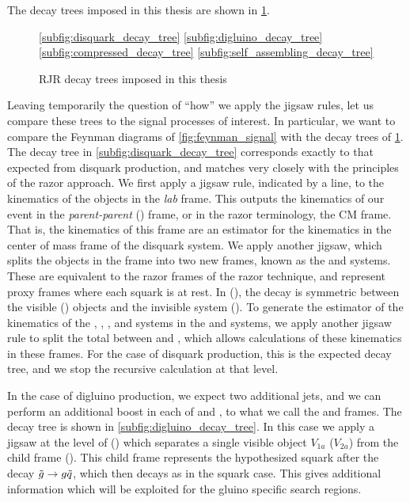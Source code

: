 The decay trees imposed in this thesis are shown in \ref{fig:decay_trees}.
\begin{figure}
\caption{RJR decay trees imposed in this thesis} \label{fig:decay_trees}
\ref{subfig:disquark_decay_tree}
\ref{subfig:digluino_decay_tree} \\
\ref{subfig:compressed_decay_tree}
\ref{subfig:self_assembling_decay_tree}
\end{figure}
Leaving temporarily the question of ``how'' we apply the jigsaw rules, let us compare these trees to the signal processes of interest.
In particular, we want to compare the Feynman diagrams of \ref{fig:feynman_signal} with the decay trees of \ref{fig:decay_trees}.
The decay tree in \ref{subfig:disquark_decay_tree} corresponds exactly to that expected from disquark production, and matches very closely with the principles of the razor approach.
We first apply a jigsaw rule, indicated by a line, to the kinematics of the objects in the \textit{lab} frame.
This outputs the kinematics of our event in the \textit{parent-parent} (\PP) frame, or in the razor terminology, the CM frame.
That is, the kinematics of this frame are an estimator for the kinematics in the center of mass frame of the disquark system.
We apply another jigsaw, which splits the objects in the \PP frame into two new frames, known as the \Pa and \Pb systems.
These are equivalent to the razor frames of the razor technique, and represent proxy frames where each squark is at rest.
In \Pa (\Pb), the decay is symmetric between the visible \Va (\Vb) objects and the invisible system \Ia (\Ib).
To generate the estimator of the kinematics of the \Va, \Vb, \Ia, and \Ib systems in the \Pa and \Pb systems, we apply another jigsaw rule to split the total \met between \Pa and \Pb, which allows calculations of these kinematics in these frames.
For the case of disquark production, this is the expected decay tree, and we stop the recursive calculation at that level.

In the case of digluino production, we expect two additional jets, and we can perform an additional boost in each of \Pa and \Pb, to what we call the \Ca and \Cb frames.
The decay tree is shown in \ref{subfig:digluino_decay_tree}.
In this case we apply a jigsaw at the level of \Pa (\Pb) which separates a single visible object $V_{1a}$ ($V_{2a}$) from the child frame \Ca (\Cb).
This child frame represents the hypothesized squark after the decay $\tilde{g} \rightarrow g \tilde{q}$, which then decays as in the squark case.
This gives additional information which will be exploited for the gluino specific search regions.

